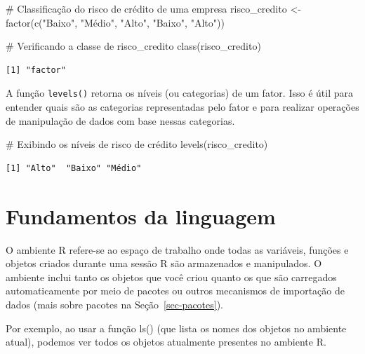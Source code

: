 \documentclass[
  portuguese,
  letterpaper,
  DIV=11,
  numbers=noendperiod]{scrreprt}
\newenvironment{Shaded}{\begin{snugshade}}{\end{snugshade}}
\newcommand{\CommentTok}[1]{\textcolor[rgb]{0.37,0.37,0.37}{#1}}
\newcommand{\FunctionTok}[1]{\textcolor[rgb]{0.28,0.35,0.67}{#1}}
\newcommand{\NormalTok}[1]{\textcolor[rgb]{0.00,0.23,0.31}{#1}}
\newcommand{\OtherTok}[1]{\textcolor[rgb]{0.00,0.23,0.31}{#1}}
\newcommand{\StringTok}[1]{\textcolor[rgb]{0.13,0.47,0.30}{#1}}
\theoremstyle{definition}
\theoremstyle{remark}
\begin{document}
\begin{Shaded}
\begin{Highlighting}[]
\CommentTok{\# Classificação do risco de crédito de uma empresa}
\NormalTok{risco\_credito }\OtherTok{\textless{}{-}} \FunctionTok{factor}\NormalTok{(}\FunctionTok{c}\NormalTok{(}\StringTok{"Baixo"}\NormalTok{, }\StringTok{"Médio"}\NormalTok{, }\StringTok{"Alto"}\NormalTok{, }\StringTok{"Baixo"}\NormalTok{, }\StringTok{"Alto"}\NormalTok{))}

\CommentTok{\# Verificando a classe de risco\_credito}
\FunctionTok{class}\NormalTok{(risco\_credito)}
\end{Highlighting}
\end{Shaded}

\begin{verbatim}
[1] "factor"
\end{verbatim}

A função \texttt{levels()} retorna os níveis (ou categorias) de um
fator. Isso é útil para entender quais são as categorias representadas
pelo fator e para realizar operações de manipulação de dados com base
nessas categorias.

\begin{Shaded}
\begin{Highlighting}[]
\CommentTok{\# Exibindo os níveis de risco de crédito}
\FunctionTok{levels}\NormalTok{(risco\_credito)}
\end{Highlighting}
\end{Shaded}

\begin{verbatim}
[1] "Alto"  "Baixo" "Médio"
\end{verbatim}

\section{Fundamentos da linguagem}\label{fundamentos-da-linguagem}

O ambiente R refere-se ao espaço de trabalho onde todas as variáveis,
funções e objetos criados durante uma sessão R são armazenados e
manipulados. O ambiente inclui tanto os objetos que você criou quanto os
que são carregados automaticamente por meio de pacotes ou outros
mecanismos de importação de dados (mais sobre pacotes na
Seção~\ref{sec-pacotes}).

Por exemplo, ao usar a função ls() (que lista os nomes dos objetos no
ambiente atual), podemos ver todos os objetos atualmente presentes no
ambiente R.
\end{document}
